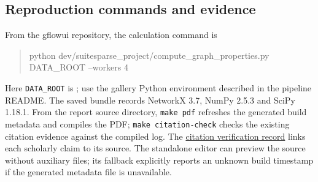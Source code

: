 \documentclass[11pt]{article}
\begin{document}
\subsection{Reproduction commands and evidence}
From the gflowui repository, the calculation command is
\begin{quote}\small\ttfamily
python dev/suitesparse\_project/compute\_graph\_properties.py DATA\_ROOT --workers 4
\end{quote}
Here \texttt{DATA\_ROOT} is ; use the gallery Python environment described in the pipeline README. The saved bundle records NetworkX 3.7, NumPy 2.5.3 and SciPy 1.18.1. From the report source directory, \texttt{make pdf} refreshes the generated build metadata and compiles the PDF; \texttt{make citation-check} checks the existing citation evidence against the compiled log. The \href{file:///Users/pgajer/current_projects/gflowui/dev/suitesparse_project/graph_measures/citation_verification.html}{citation verification record} links each scholarly claim to its source. The standalone editor can preview the source without auxiliary files; its fallback explicitly reports an unknown build timestamp if the generated metadata file is unavailable.
\end{document}
